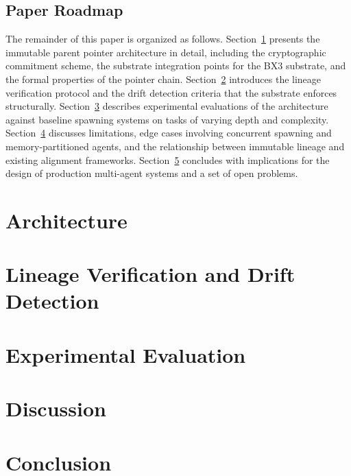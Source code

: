 \subsection{Paper Roadmap}

The remainder of this paper is organized as follows. Section~\ref{section:architecture} presents the immutable parent pointer architecture in detail, including the cryptographic commitment scheme, the substrate integration points for the BX3 substrate, and the formal properties of the pointer chain. Section~\ref{section:verification} introduces the lineage verification protocol and the drift detection criteria that the substrate enforces structurally. Section~\ref{section:experiments} describes experimental evaluations of the architecture against baseline spawning systems on tasks of varying depth and complexity. Section~\ref{section:discussion} discusses limitations, edge cases involving concurrent spawning and memory-partitioned agents, and the relationship between immutable lineage and existing alignment frameworks. Section~\ref{section:conclusion} concludes with implications for the design of production multi-agent systems and a set of open problems.

\section{Architecture}
\label{section:architecture}

\section{Lineage Verification and Drift Detection}
\label{section:verification}

\section{Experimental Evaluation}
\label{section:experiments}

\section{Discussion}
\label{section:discussion}

\section{Conclusion}
\label{section:conclusion}
